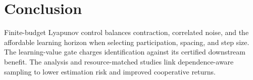 \documentclass[journal]{IEEEtran}
\begin{document}
\section{Conclusion}
Finite-budget Lyapunov control balances contraction, correlated noise, and the affordable learning horizon when selecting participation, spacing, and step size.
The learning-value gate charges identification against its certified downstream benefit.
The analysis and resource-matched studies link dependence-aware sampling to lower estimation risk and improved cooperative returns.

\appendices



\end{document}
